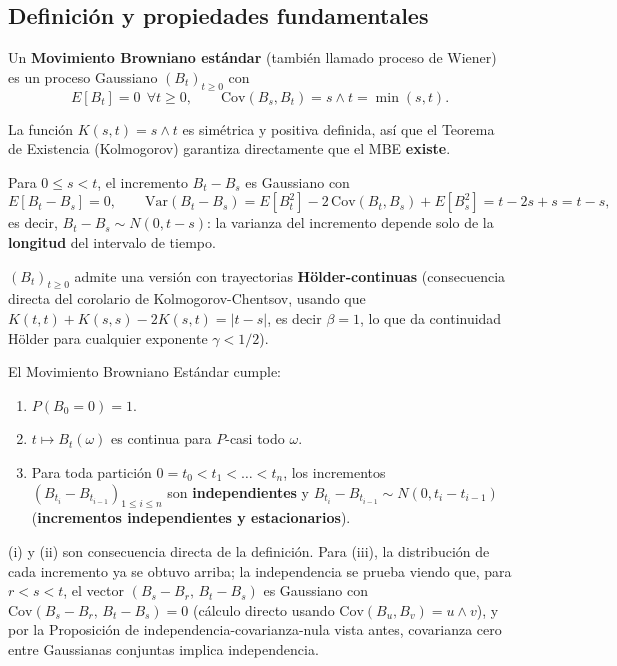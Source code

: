 \subsection{Definición y propiedades fundamentales}

\begin{definicion}
Un \textbf{Movimiento Browniano estándar} (también llamado proceso de Wiener) es un proceso Gaussiano $(B_t)_{t\ge0}$ con
\[
E[B_t]=0\ \ \forall t\ge0, \qquad \text{Cov}(B_s,B_t) = s\wedge t = \min(s,t).
\]
\end{definicion}

\begin{observacion}
La función $K(s,t)=s\wedge t$ es simétrica y positiva definida, así que el Teorema de Existencia (Kolmogorov) garantiza directamente que el MBE \textbf{existe}.
\end{observacion}

\begin{prop}
Para $0\le s<t$, el incremento $B_t-B_s$ es Gaussiano con
\[
E[B_t-B_s]=0, \qquad \text{Var}(B_t-B_s) = E[B_t^2]-2\,\text{Cov}(B_t,B_s)+E[B_s^2] = t-2s+s = t-s,
\]
es decir, $B_t - B_s \sim N(0,t-s)$: la varianza del incremento depende solo de la \textbf{longitud} del intervalo de tiempo.
\end{prop}

\begin{teo}
$(B_t)_{t\ge0}$ admite una versión con trayectorias \textbf{Hölder-continuas} (consecuencia directa del corolario de Kolmogorov-Chentsov, usando que $K(t,t)+K(s,s)-2K(s,t)=|t-s|$, es decir $\beta=1$, lo que da continuidad Hölder para cualquier exponente $\gamma<1/2$).
\end{teo}

\begin{teo}
El Movimiento Browniano Estándar cumple:
\begin{enumerate}
    \item[(i)] $P(B_0=0)=1$.
    \item[(ii)] $t\mapsto B_t(\omega)$ es continua para $P$-casi todo $\omega$.
    \item[(iii)] Para toda partición $0=t_0<t_1<\dots<t_n$, los incrementos $(B_{t_i}-B_{t_{i-1}})_{1\le i\le n}$ son \textbf{independientes} y $B_{t_i}-B_{t_{i-1}}\sim N(0,t_i-t_{i-1})$ (\textbf{incrementos independientes y estacionarios}).
\end{enumerate}
\end{teo}
\begin{observacion}
(i) y (ii) son consecuencia directa de la definición. Para (iii), la distribución de cada incremento ya se obtuvo arriba; la independencia se prueba viendo que, para $r<s<t$, el vector $(B_s-B_r,\,B_t-B_s)$ es Gaussiano con $\text{Cov}(B_s-B_r,\,B_t-B_s)=0$ (cálculo directo usando $\text{Cov}(B_u,B_v)=u\wedge v$), y por la Proposición de independencia-covarianza-nula vista antes, covarianza cero entre Gaussianas conjuntas implica independencia.
\end{observacion}

